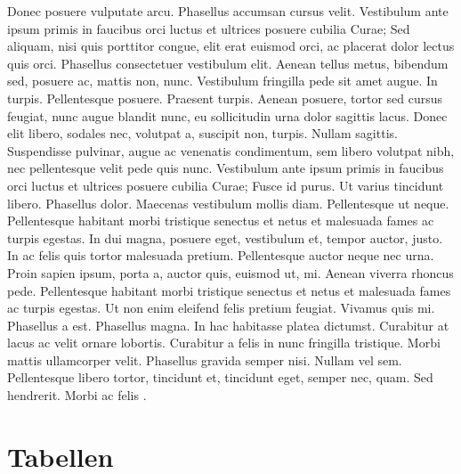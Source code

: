 Donec posuere vulputate arcu. Phasellus accumsan cursus velit. Vestibulum ante ipsum primis in faucibus orci luctus et ultrices posuere cubilia Curae; Sed aliquam, nisi quis porttitor congue, elit erat euismod orci, ac placerat dolor lectus quis orci. Phasellus consectetuer vestibulum elit. Aenean tellus metus, bibendum sed, posuere ac, mattis non, nunc. Vestibulum fringilla pede sit amet augue. In turpis. Pellentesque posuere. Praesent turpis. Aenean posuere, tortor sed cursus feugiat, nunc augue blandit nunc, eu sollicitudin urna dolor sagittis lacus. Donec elit libero, sodales nec, volutpat a, suscipit non, turpis. Nullam sagittis. Suspendisse pulvinar, augue ac venenatis condimentum, sem libero volutpat nibh, nec pellentesque velit pede quis nunc. Vestibulum ante ipsum primis in faucibus orci luctus et ultrices posuere cubilia Curae; Fusce id purus. Ut varius tincidunt libero. Phasellus dolor. Maecenas vestibulum mollis diam. Pellentesque ut neque. Pellentesque habitant morbi tristique senectus et netus et malesuada fames ac turpis egestas. In dui magna, posuere eget, vestibulum et, tempor auctor, justo. In ac felis quis tortor malesuada pretium. Pellentesque auctor neque nec urna. Proin sapien ipsum, porta a, auctor quis, euismod ut, mi. Aenean viverra rhoncus pede. Pellentesque habitant morbi tristique senectus et netus et malesuada fames ac turpis egestas. Ut non enim eleifend felis pretium feugiat. Vivamus quis mi. Phasellus a est. Phasellus magna. In hac habitasse platea dictumst. Curabitur at lacus ac velit ornare lobortis. Curabitur a felis in nunc fringilla tristique. Morbi mattis ullamcorper velit. Phasellus gravida semper nisi. Nullam vel sem. Pellentesque libero tortor, tincidunt et, tincidunt eget, semper nec, quam. Sed hendrerit. Morbi ac felis \cite{guttich_intrusion-detection_2018}.


\section{Tabellen}

